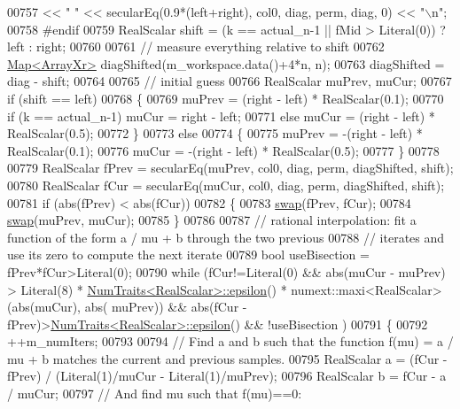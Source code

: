 \begin{DoxyCode}
00757               << \textcolor{stringliteral}{" "}       << secularEq(0.9*(left+right), col0, diag, perm, diag, 0) << \textcolor{stringliteral}{"\(\backslash\)n"};
00758 \textcolor{preprocessor}{#endif}
00759     RealScalar shift = (k == actual\_n-1 || fMid > Literal(0)) ? left : right;
00760     
00761     \textcolor{comment}{// measure everything relative to shift}
00762     \hyperlink{group___core___module_class_eigen_1_1_map}{Map<ArrayXr>} diagShifted(m\_workspace.data()+4*n, n);
00763     diagShifted = diag - shift;
00764     
00765     \textcolor{comment}{// initial guess}
00766     RealScalar muPrev, muCur;
00767     \textcolor{keywordflow}{if} (shift == left)
00768     \{
00769       muPrev = (right - left) * RealScalar(0.1);
00770       \textcolor{keywordflow}{if} (k == actual\_n-1) muCur = right - left;
00771       \textcolor{keywordflow}{else}                 muCur = (right - left) * RealScalar(0.5);
00772     \}
00773     \textcolor{keywordflow}{else}
00774     \{
00775       muPrev = -(right - left) * RealScalar(0.1);
00776       muCur = -(right - left) * RealScalar(0.5);
00777     \}
00778 
00779     RealScalar fPrev = secularEq(muPrev, col0, diag, perm, diagShifted, shift);
00780     RealScalar fCur = secularEq(muCur, col0, diag, perm, diagShifted, shift);
00781     \textcolor{keywordflow}{if} (abs(fPrev) < abs(fCur))
00782     \{
00783       \hyperlink{endian_8c_a3ca5ecd34b04d6a243c054ac3a57f68d}{swap}(fPrev, fCur);
00784       \hyperlink{endian_8c_a3ca5ecd34b04d6a243c054ac3a57f68d}{swap}(muPrev, muCur);
00785     \}
00786 
00787     \textcolor{comment}{// rational interpolation: fit a function of the form a / mu + b through the two previous}
00788     \textcolor{comment}{// iterates and use its zero to compute the next iterate}
00789     \textcolor{keywordtype}{bool} useBisection = fPrev*fCur>Literal(0);
00790     \textcolor{keywordflow}{while} (fCur!=Literal(0) && abs(muCur - muPrev) > Literal(8) * 
      \hyperlink{group___core___module_struct_eigen_1_1_num_traits}{NumTraits<RealScalar>::epsilon}() * numext::maxi<RealScalar>(abs(muCur), abs(
      muPrev)) && abs(fCur - fPrev)>\hyperlink{group___core___module_struct_eigen_1_1_num_traits}{NumTraits<RealScalar>::epsilon}() && !useBisection
      )
00791     \{
00792       ++m\_numIters;
00793 
00794       \textcolor{comment}{// Find a and b such that the function f(mu) = a / mu + b matches the current and previous samples.}
00795       RealScalar a = (fCur - fPrev) / (Literal(1)/muCur - Literal(1)/muPrev);
00796       RealScalar b = fCur - a / muCur;
00797       \textcolor{comment}{// And find mu such that f(mu)==0:}

\end{DoxyCode}
